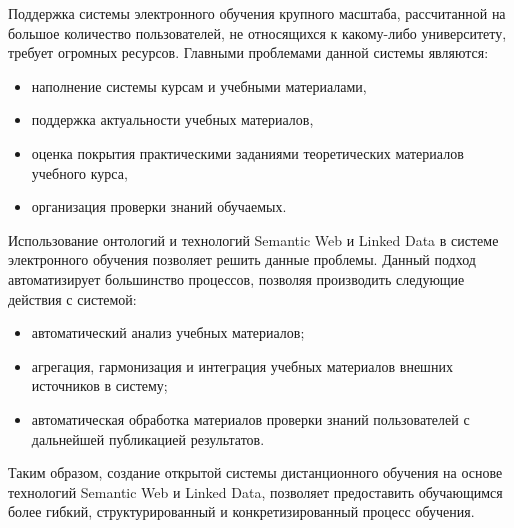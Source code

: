 Поддержка системы электронного обучения крупного масштаба, рассчитанной на большое количество пользователей, не относящихся к какому-либо университету, требует огромных ресурсов. Главными проблемами данной системы являются: 

\begin{itemize}
\item наполнение системы курсам и учебными материалами,
\item поддержка актуальности учебных материалов, 
\item оценка покрытия практическими заданиями теоретических материалов учебного курса,
\item организация проверки знаний обучаемых.
\end{itemize}

Использование онтологий и технологий Semantic Web и Linked Data в системе электронного обучения позволяет решить данные проблемы. Данный подход автоматизирует большинство процессов, позволяя производить следующие действия с системой:

\begin{itemize}
\item автоматический анализ учебных материалов;
\item агрегация, гармонизация и интеграция учебных материалов внешних источников в систему;
\item автоматическая обработка материалов проверки знаний пользователей с дальнейшей публикацией результатов. 
\end{itemize}

Таким образом, создание открытой системы дистанционного обучения на основе технологий Semantic Web и Linked Data, позволяет предоставить обучающимся более гибкий, структурированный и конкретизированный процесс обучения. 


\clearpage
